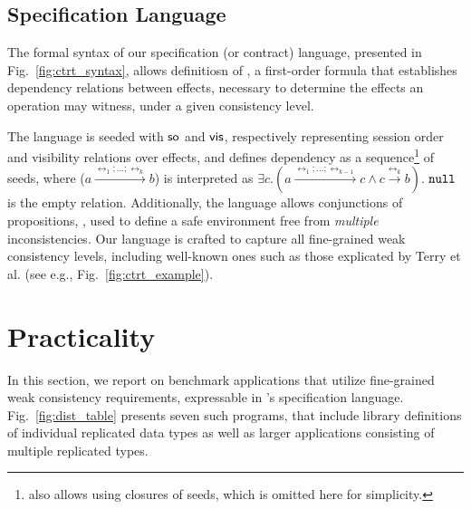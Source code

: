 \documentclass[authorversion]{sig-alternate-05-2015}
\begin{document}
\subsection{Specification Language}
The formal syntax of our specification (or contract) language, presented
in
Fig.~\ref{fig:ctrt_syntax}, allows definitiosn of
\propS{}, a first-order formula
that establishes dependency relations between effects,
necessary to determine the effects an operation may witness, under
a given consistency level.

The language is seeded with ${\textsf{so}}$ and ${\normalfont \textsf{vis}}$, respectively
representing session
order and visibility relations over effects,
and defines dependency \relationS{} as a sequence\footnote{\tool\; also
	allows
	using closures of seeds, which is omitted here for
simplicity.} of seeds,
where
({\footnotesize $a \xrightarrow{\rel_1;...;\rel_k} b$})
is interpreted as
{\footnotesize$\exists c. (a
	\xrightarrow{\rel_1;...;\rel_{k-1}} c
\wedge c \xrightarrow {\rel_k} b)$}.
$\mathtt{null}{}$ is the empty relation.
Additionally, the language allows conjunctions of propositions,
\specS{},
used to define a safe environment
free from \emph{multiple} inconsistencies.
Our language is crafted to capture all fine-grained weak consistency
levels, including well-known ones such as those explicated by Terry et
al. \cite{terry}
(see e.g., Fig.~\ref{fig:ctrt_example}).





















\section{Practicality}
In this section, we report on
benchmark applications that utilize fine-grained weak consistency
requirements, expressable
in \tool's specification language.
Fig.~\ref{fig:dist_table} presents seven such programs, that include
library definitions of individual replicated data types as well as
larger applications consisting of multiple replicated types.
\end{document}
